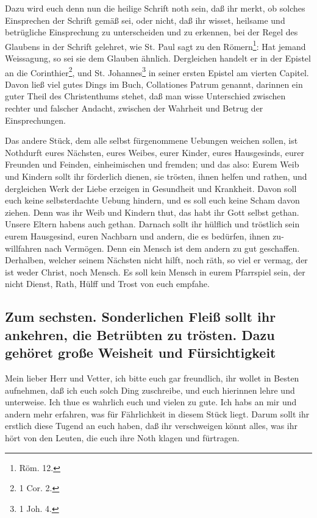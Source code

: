 Dazu wird euch denn nun die heilige Schrift noth sein, daß ihr merkt, ob solches Einsprechen der Schrift gemäß sei, oder nicht, daß ihr wisset, heilsame und betrügliche Einsprechung zu unterscheiden und zu erkennen, bei der Regel des Glaubens in der Schrift gelehret, wie St. Paul sagt zu den Römern\footnote{Röm. 12.}: Hat jemand Weissagung, so sei sie dem Glauben ähnlich. Dergleichen handelt er in der Epistel an die Corinthier\footnote{1 Cor. 2.}, und St. Johannes\footnote{1 Joh. 4.} in seiner ersten Epistel am vierten Capitel. Davon ließ viel gutes Dings im Buch, Collationes Patrum genannt, darinnen ein guter Theil des Christenthums stehet, daß man wisse Unterschied zwischen rechter und falscher Andacht, zwischen der Wahrheit und Betrug der Einsprechungen.

Das andere Stück, dem alle selbst fürgenommene Uebungen weichen sollen, ist Nothdurft eures Nächsten, eures Weibes, eurer Kinder, eures Hausgesinds, eurer Freunden und Feinden, einheimischen und fremden; und das also: Eurem Weib und Kindern sollt ihr förderlich dienen, sie trösten, ihnen helfen und rathen, und dergleichen Werk der Liebe erzeigen in Gesundheit und Krankheit. Davon soll euch keine selbsterdachte Uebung hindern, und es soll euch keine Scham davon ziehen. Denn was ihr Weib und Kindern thut, das habt ihr Gott selbst gethan. Unsere Eltern habens auch gethan. Darnach sollt ihr
hülflich und tröstlich sein eurem Hausgesind, euren Nachbarn und andern, die es bedürfen, ihnen zu-willfahren nach Vermögen. Denn ein Mensch ist dem andern zu gut geschaffen. Derhalben, welcher seinem Nächsten nicht hilft, noch räth, so viel er vermag, der ist weder Christ, noch Mensch. Es soll kein Mensch in eurem Pfarrspiel sein, der nicht Dienst, Rath, Hülff und Trost von euch empfahe.

\subsection[Zum sechsten]{Zum sechsten. Sonderlichen Fleiß sollt ihr ankehren, die Betrübten zu trösten. Dazu gehöret große Weisheit und Fürsichtigkeit}

Mein lieber Herr und Vetter, ich bitte euch gar freundlich, ihr wollet in Besten aufnehmen, daß ich euch solch Ding zuschreibe, und euch hierinnen lehre und unterweise. Ich thue es wahrlich euch und vielen zu gute. Ich habs an mir und andern mehr erfahren, was für Fährlichkeit in diesem Stück liegt. Darum sollt ihr erstlich diese Tugend an euch haben, daß ihr verschweigen könnt alles, was ihr hört von den Leuten, die euch ihre Noth klagen und fürtragen.

